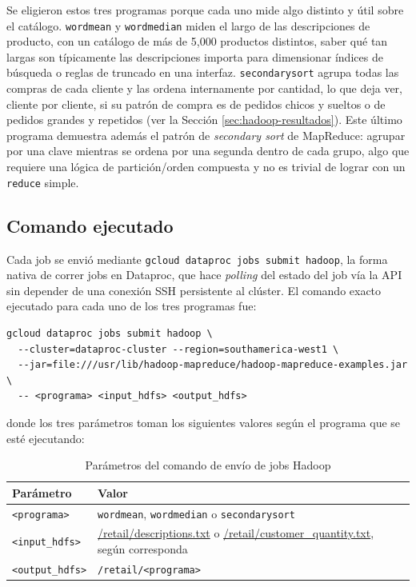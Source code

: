 Se eligieron estos tres programas porque cada uno mide algo distinto y útil sobre el catálogo. \texttt{wordmean} y \texttt{wordmedian} miden el largo de las descripciones de producto, con un catálogo de más de 5{,}000 productos distintos, saber qué tan largas son típicamente las descripciones importa para dimensionar índices de búsqueda o reglas de truncado en una interfaz. \texttt{secondarysort} agrupa todas las compras de cada cliente y las ordena internamente por cantidad, lo que deja ver, cliente por cliente, si su patrón de compra es de pedidos chicos y sueltos o de pedidos grandes y repetidos (ver la Sección \ref{sec:hadoop-resultados}). Este último programa demuestra además el patrón de \emph{secondary sort} de MapReduce: agrupar por una clave mientras se ordena por una segunda dentro de cada grupo, algo que requiere una lógica de partición/orden compuesta y no es trivial de lograr con un \texttt{reduce} simple.

\subsection{Comando ejecutado}

Cada job se envió mediante \texttt{gcloud dataproc jobs submit hadoop}, la forma nativa de correr jobs en Dataproc, que hace \emph{polling} del estado del job vía la API sin depender de una conexión SSH persistente al clúster. El comando exacto ejecutado para cada uno de los tres programas fue:

\begin{verbatim}
gcloud dataproc jobs submit hadoop \
  --cluster=dataproc-cluster --region=southamerica-west1 \
  --jar=file:///usr/lib/hadoop-mapreduce/hadoop-mapreduce-examples.jar \
  -- <programa> <input_hdfs> <output_hdfs>
\end{verbatim}

donde los tres parámetros toman los siguientes valores según el programa que se esté ejecutando:

\begin{table}[H]
\centering
\small
\begin{tabular}{lp{9cm}}
\toprule
\textbf{Parámetro} & \textbf{Valor} \\
\midrule
\texttt{<programa>} & \texttt{wordmean}, \texttt{wordmedian} o \texttt{secondarysort} \\
\texttt{<input\_hdfs>} & \url{/retail/descriptions.txt} o \url{/retail/customer_quantity.txt}, según corresponda \\
\texttt{<output\_hdfs>} & \texttt{/retail/<programa>} \\
\bottomrule
\end{tabular}
\caption{Parámetros del comando de envío de jobs Hadoop}
\end{table}

